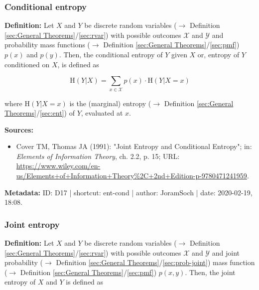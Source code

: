 \documentclass[a4paper,12pt,twoside]{book}
\begin{document}
\subsubsection[\textit{Conditional entropy}]{Conditional entropy} \label{sec:ent-cond}
\setcounter{equation}{0}

\textbf{Definition:} Let $X$ and $Y$ be discrete random variables ($\rightarrow$ Definition \ref{sec:General Theorems}/\ref{sec:rvar}) with possible outcomes $\mathcal{X}$ and $\mathcal{Y}$ and probability mass functions ($\rightarrow$ Definition \ref{sec:General Theorems}/\ref{sec:pmf}) $p(x)$ and $p(y)$. Then, the conditional entropy of $Y$ given $X$ or, entropy of $Y$ conditioned on $X$, is defined as

\begin{equation} \label{eq:ent-cond-ent-cond}
\mathrm{H}(Y|X) = \sum_{x \in \mathcal{X}} p(x) \cdot \mathrm{H}(Y|X=x)
\end{equation}

where $\mathrm{H}(Y \vert X=x)$ is the (marginal) entropy ($\rightarrow$ Definition \ref{sec:General Theorems}/\ref{sec:ent}) of $Y$, evaluated at $x$.


\vspace{1em}
\textbf{Sources:}
\begin{itemize}
\item Cover TM, Thomas JA (1991): "Joint Entropy and Conditional Entropy"; in: \textit{Elements of Information Theory}, ch. 2.2, p. 15; URL: \url{https://www.wiley.com/en-us/Elements+of+Information+Theory%2C+2nd+Edition-p-9780471241959}.
\end{itemize}


\vspace{1em}
\textbf{Metadata:} ID: D17 | shortcut: ent-cond | author: JoramSoch | date: 2020-02-19, 18:08.
\vspace{1em}



\subsubsection[\textit{Joint entropy}]{Joint entropy} \label{sec:ent-joint}
\setcounter{equation}{0}

\textbf{Definition:} Let $X$ and $Y$ be discrete random variables ($\rightarrow$ Definition \ref{sec:General Theorems}/\ref{sec:rvar}) with possible outcomes $\mathcal{X}$ and $\mathcal{Y}$ and joint probability ($\rightarrow$ Definition \ref{sec:General Theorems}/\ref{sec:prob-joint}) mass function ($\rightarrow$ Definition \ref{sec:General Theorems}/\ref{sec:pmf}) $p(x,y)$. Then, the joint entropy of $X$ and $Y$ is defined as
\end{document}
